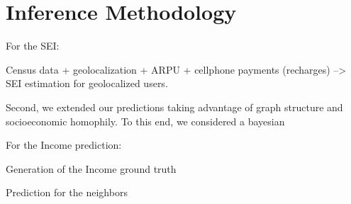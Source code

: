 \section{Inference Methodology}

For the SEI:

Census data + geolocalization + ARPU + cellphone payments (recharges)  --> SEI estimation for geolocalized users. 

Second, we extended our predictions taking advantage of graph structure and socioeconomic homophily. To this end, we considered a bayesian  


For the Income prediction:

Generation of the Income ground truth

Prediction for the neighbors

